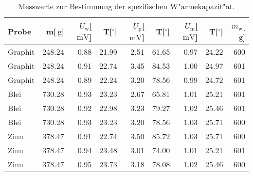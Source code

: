 
\begin{table}[!h]
\begin{center}
\begin{tabular}{|l|r|r|r|r|r|r|r|r|}
\hline
Probe & m[$\SI{}{\gram}$] & $U_\mathrm{w}$[$\SI{}{\milli\volt}$] & T[$^\circ$] & $U_\mathrm{p}$[$\SI{}{\milli\volt}$] & T[$^\circ$] & $U_\mathrm{m}$[$\SI{}{\milli\volt}$] & T[$^\circ$] & $m_\mathrm{w}$[$\SI{}{\gram}$]\\
\hline
\hline
Graphit & 248.24 & 0.88 & 21.99 & 2.51 & 61.65 & 0.97 & 24.22 & 600 \\
Graphit & 248.24 & 0.91 & 22.74 & 3.45 & 84.53 & 1.00 & 24.97 & 601 \\
Graphit & 248.24 & 0.89 & 22.24 & 3.20 & 78.56 & 0.99 & 24.72 & 601 \\
\hline
Blei    & 730.28 & 0.93 & 23.23 & 2.67 & 65.81 & 1.01 & 25.21 & 601 \\
Blei    & 730.28 & 0.92 & 22.98 & 3.23 & 79.27 & 1.02 & 25.46 & 601 \\
Blei    & 730.28 & 0.93 & 23.23 & 3.20 & 78.56 & 1.03 & 25.71 & 600 \\
\hline
Zinn    & 378.47 & 0.91 & 22.74 & 3.50 & 85.72 & 1.03 & 25.71 & 600 \\
Zinn    & 378.47 & 0.94 & 23.48 & 3.01 & 74.00 & 1.01 & 25.21 & 601 \\
Zinn    & 378.47 & 0.95 & 23.73 & 3.18 & 78.08 & 1.02 & 25.46 & 600 \\
\hline
\end{tabular}
\caption[]{Messwerte zur Bestimmung der spezifischen W"armekapazit"at.}
\label{proben}
\end{center}
\end{table}